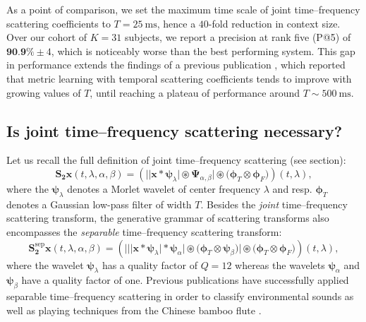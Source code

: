 \documentclass{bmcart}
\newcommand{\lnameref}[1]{%
\bgroup
\let\nmu\MakeLowercase
\nameref{#1}\egroup}
\newcommand{\nmu}{}
\begin{document}
As a point of comparison, we set the maximum time scale of joint time--frequency scattering coefficients to $T=\SI{25}{\milli\second}$, hence a $40$-fold reduction in context size.
Over our cohort of $K=31$ subjects, we report a precision at rank five (P@5) of $\textbf{90.9\%} \pm 4$, which is noticeably worse than the best performing system.
This gap in performance extends the findings of a previous publication \cite{lostanlen2018extended}, which reported that metric learning with temporal scattering coefficients tends to improve with growing values of $T$, until reaching a plateau of performance around $T\sim\SI{500}{\milli\second}$.


\subsection*{Is joint time--frequency scattering necessary?}

Let us recall the full definition of joint time--frequency scattering (see \lnameref{sec:methods} section):
\begin{equation}
\mathbf{S_2}\boldsymbol{x}(t,\lambda,\alpha,\beta) =
\left(
\Big\vert
\big\vert
\boldsymbol{x} \ast \boldsymbol{\psi}_{\lambda}
\big\vert
\circledast
\boldsymbol{\Psi}_{\alpha,\beta}
\Big\vert
\circledast
\big(\boldsymbol{\phi}_{T} \otimes \boldsymbol{\phi}_{F})
\right)(t,\lambda),
\label{eq:joint-scattering}
\end{equation}
where the $\boldsymbol{\psi}_{\lambda}$ denotes a Morlet wavelet of center frequency $\lambda$ and resp. $\boldsymbol{\phi}_T$ denotes a Gaussian low-pass filter of width $T$.
Besides the \emph{joint} time--frequency scattering transform, the generative grammar of scattering transforms \cite{lostanlen2019chapter} also encompasses the \emph{separable} time--frequency scattering transform:
\begin{equation}
\mathbf{S_2^{\mathrm{sep}}}\boldsymbol{x}(t,\lambda,\alpha,\beta) =
\left(
\bigg\vert
\Big\vert
\big\vert
\boldsymbol{x} \ast \boldsymbol{\psi}_{\lambda}
\big\vert
\ast
\boldsymbol{\psi}_{\alpha}
\Big\vert
\circledast
\big(\boldsymbol{\phi}_{T} \otimes \boldsymbol{\psi}_{\beta}\big)
\bigg\vert
\circledast
\big(\boldsymbol{\phi}_{T} \otimes \boldsymbol{\phi}_F\big)
\right)(t, \lambda),
\label{eq:separable-scattering}
\end{equation}
where the wavelet $\boldsymbol{\psi}_{\lambda}$ has a quality factor of $Q=12$ whereas the wavelets $\boldsymbol{\psi}_{\alpha}$ and $\boldsymbol{\psi}_{\beta}$ have a quality factor of one.
Previous publications have successfully applied separable time--frequency scattering in order to classify environmental sounds \cite{bauge2013icassp} as well as playing techniques from the Chinese bamboo flute \cite{wang2019ismir}.
\end{document}
